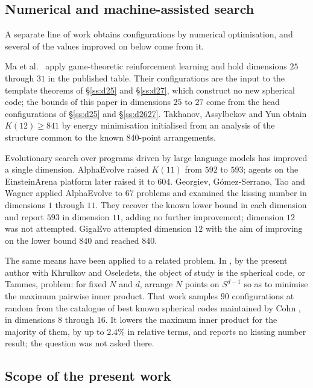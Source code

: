 \documentclass[11pt]{amsart}
\theoremstyle{remark}
\begin{document}
\subsection{Numerical and machine-assisted search}\label{ss:rw-search}

A separate line of work obtains configurations by numerical optimisation, and
several of the values improved on below come from it.

Ma et al.\ \cite{ma-etal2025} apply game-theoretic reinforcement learning and hold
dimensions $25$ through $31$ in the published table. Their configurations are the
input to the template theorems of \S\ref{ss:d25} and \S\ref{ss:d27}, which
construct no new spherical code; the bounds of this paper in dimensions $25$ to
$27$ come from the head configurations of \S\ref{ss:d25} and \S\ref{ss:d2627}. Takhanov, Assylbekov and Yun
\cite{takhanov-assylbekov-yun2026} obtain $K(12)\ge841$ by energy minimisation initialised from
an analysis of the structure common to the known $840$-point arrangements.

Evolutionary search over programs driven by large language models has improved a
single dimension. AlphaEvolve \cite{novikov-etal2025} raised $K(11)$ from $592$ to
$593$; agents on the EinsteinArena platform \cite{bianchi-kwon-pappu-zou2026} later
raised it to $604$. Georgiev, G\'omez-Serrano, Tao and Wagner
\cite{georgiev-gomezserrano-tao-wagner2025} applied AlphaEvolve to $67$ problems
and examined the kissing number in dimensions $1$ through $11$. They recover the
known lower bound in each dimension and report $593$ in dimension $11$, adding no
further improvement; dimension $12$ was not attempted. GigaEvo
\cite{khrulkov-etal2025} attempted dimension $12$ with the aim of improving on the
lower bound $840$ and reached $840$.

The same means have been applied to a related problem. In
\cite{kravatskiy-khrulkov-oseledets2026}, by the present author with Khrulkov and
Oseledets, the object of study is the spherical code, or Tammes, problem: for fixed
$N$ and $d$, arrange $N$ points on $S^{d-1}$ so as to minimise the maximum pairwise
inner product. That work samples $90$ configurations at random from the catalogue of best known
spherical codes maintained by Cohn \cite{cohn-spherical}, in dimensions $8$
through $16$. It lowers the maximum inner product for the majority of them, by up
to $2.4\%$ in relative terms, and reports no kissing number result; the question
was not asked there.

\subsection{Scope of the present work}\label{ss:rw-position}
\end{document}

